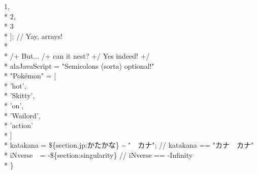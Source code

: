 \documentclass[12pt,english]{article}
\begin{document}
{\hspace*{2cm}\textcolor{src-numeric}{1}\textcolor{src-symbol}{,} \\*
\hspace*{2cm}\textcolor{src-numeric}{2}\textcolor{src-symbol}{,} \\*
\hspace*{2cm}\textcolor{src-numeric}{3} \\*
\hspace*{1cm}\textcolor{src-symbol}{];} \textcolor{src-comment}{// Yay, arrays!} \\*
 \\*
\hspace*{1cm}\textcolor{src-comment}{/+ But... /+ can it nest? +/ Yes indeed! +/} \\*
\hspace*{1cm}\textcolor{src-ident}{alaJavaScript} \textcolor{src-symbol}{=}
\textcolor{src-quote}{"}\textcolor{src-string}{Semicolons (sorta)
optional!}\textcolor{src-quote}{"} \\*
\hspace*{1cm}\textcolor{src-type}{"}\textcolor{src-ident}{Pokémon}\textcolor{src-type}{"}
\textcolor{src-symbol}{=} \textcolor{src-symbol}{[} \\*
\hspace*{2cm}\textcolor{src-quote}{'}\textcolor{src-string}{hot}\textcolor{src-quote}{'}\textcolor{src-symbol}{,}
\\*
\hspace*{2cm}\textcolor{src-quote}{'}\textcolor{src-string}{Skitty}\textcolor{src-quote}{'}\textcolor{src-symbol}{,}
\\*
\hspace*{2cm}\textcolor{src-quote}{'}\textcolor{src-string}{on}\textcolor{src-quote}{'}\textcolor{src-symbol}{,}
\\*
\hspace*{2cm}\textcolor{src-quote}{'}\textcolor{src-string}{Wailord}\textcolor{src-quote}{'}\textcolor{src-symbol}{,}
\\*
\hspace*{2cm}\textcolor{src-quote}{'}\textcolor{src-string}{action}\textcolor{src-quote}{'}
\\*
\hspace*{1cm}\textcolor{src-symbol}{]} \\*
\hspace*{1cm}\textcolor{src-ident}{katakana} \textcolor{src-symbol}{=}
\textcolor{src-type}{\$\{section.jp:\textsf{かたかな}\}}
\textasciitilde{}
\textcolor{src-quote}{"}\textcolor{src-string}{\textsf{　カナ}}\textcolor{src-quote}{"}\textcolor{src-symbol}{;}
\textcolor{src-comment}{// katakana == "\textsf{カナ　カナ}"} \\*
\hspace*{1cm}\textcolor{src-ident}{iNverse}~~\textcolor{src-symbol}{=}
\textcolor{src-symbol}{-}\textcolor{src-type}{\$\{section:singularity\}}
\textcolor{src-comment}{// iNverse == -Infinity} \\*
\textcolor{src-symbol}{\}}
}
\end{document}
